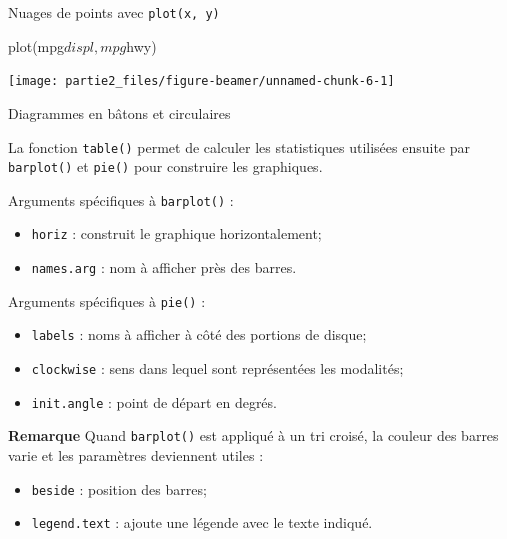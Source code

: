 \documentclass[12pt,ignorenonframetext,]{beamer}
\newenvironment{Shaded}{}{}
\newcommand{\KeywordTok}[1]{\textcolor[rgb]{0.00,0.00,1.00}{#1}}
\newcommand{\OperatorTok}[1]{#1}
\newcommand{\NormalTok}[1]{#1}
\providecommand{\tightlist}{%
  \setlength{\itemsep}{0pt}\setlength{\parskip}{0pt}}
\renewenvironment{Shaded}{\begin{snugshade}}{\end{snugshade}}
\begin{document}
\begin{frame}[fragile]{Nuages de points avec \texttt{plot(x,\ y)}}

\centering \footnotesize

\begin{Shaded}
\begin{Highlighting}[]
\KeywordTok{plot}\NormalTok{(mpg}\OperatorTok{$}\NormalTok{displ, mpg}\OperatorTok{$}\NormalTok{hwy)}
\end{Highlighting}
\end{Shaded}

\texttt{[image: partie2\_files/figure-beamer/unnamed-chunk-6-1]}

\end{frame}

\begin{frame}[fragile]{Diagrammes en bâtons et circulaires}

La fonction \texttt{table()} permet de calculer les statistiques
utilisées ensuite par \texttt{barplot()} et \texttt{pie()} pour
construire les graphiques.

\pause Arguments spécifiques à \texttt{barplot()} : \vspace{-3mm}

\begin{itemize}
\tightlist
\item
  \texttt{horiz} : construit le graphique horizontalement;
\item
  \texttt{names.arg} : nom à afficher près des barres.
\end{itemize}

\pause Arguments spécifiques à \texttt{pie()} : \vspace{-3mm}

\begin{itemize}
\tightlist
\item
  \texttt{labels} : noms à afficher à côté des portions de disque;
\item
  \texttt{clockwise} : sens dans lequel sont représentées les modalités;
\item
  \texttt{init.angle} : point de départ en degrés.
\end{itemize}

\pause

\textbf{Remarque} Quand \texttt{barplot()} est appliqué à un tri croisé,
la couleur des barres varie et les paramètres deviennent utiles :
\vspace{-3mm}

\begin{itemize}
\tightlist
\item
  \texttt{beside} : position des barres;
\item
  \texttt{legend.text} : ajoute une légende avec le texte indiqué.
\end{itemize}

\end{frame}
\end{document}
